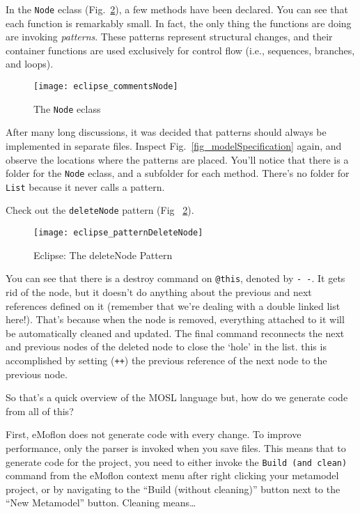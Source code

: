 In the \texttt{Node} eclass (Fig.~\ref{fig_patternDeleteNode}), a few methods have been declared. You can see that each function is remarkably small. In fact,
the only thing the functions are doing are invoking \emph{patterns}. These patterns represent structural changes, and their container functions are used
exclusively for control flow (i.e., sequences, branches, and loops).

 \begin{figure}[htbp]
  \centering
  \texttt{[image: eclipse\_commentsNode]}
  \caption{The \texttt{Node} eclass}
  \label{fig_eclassNode}
\end{figure}


After many long discussions, it was decided that patterns should always be implemented in separate files. Inspect Fig.~\ref{fig_modelSpecification} again, and
observe the locations where the patterns are placed. You'll notice that there is a folder for the \texttt{Node} eclass, and a subfolder for each method. There's
no folder for \texttt{List} because it never calls a pattern.

Check out the \texttt{deleteNode} pattern (Fig ~\ref{fig_patternDeleteNode}).

 \begin{figure}[htbp]
  \centering
  \texttt{[image: eclipse\_patternDeleteNode]}
  \caption{Eclipse: The deleteNode Pattern}
  \label{fig_patternDeleteNode}
\end{figure}

You can see that there is a destroy command on \texttt{@this}, denoted by \texttt{-~-}. It gets rid of the node, but it doesn't do anything about the previous
and next references defined on it (remember that we're dealing with a double linked list here!). That's because when the node is removed, everything attached to it
will be automatically cleaned and updated. The final command reconnects the next and previous nodes of the deleted node to close the `hole' in the list. this is
accomplished by setting (\texttt{++}) the previous reference of the next node to the previous node.
 
So that's a quick overview of the MOSL language but, how do we generate code from all of this?


First, eMoflon does not generate code with every change. To improve performance, only the parser is invoked when you save files. This means
that to generate code for the project, you need to either invoke the \texttt{Build (and clean)} command from the eMoflon context menu after right clicking your
metamodel project, or by navigating to the ``Build (without cleaning)'' button next to the ``New Metamodel'' button. Cleaning means\ldots
